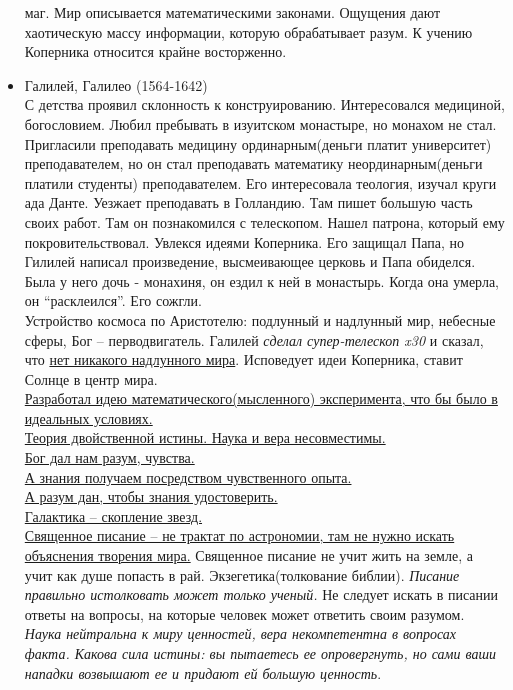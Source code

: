 \documentclass[a4paper,12pt]{report} %
\begin{document}
\begin{itemize}
  маг. Мир описывается математическими законами. Ощущения дают
  хаотическую массу информации, которую обрабатывает разум. К учению
  Коперника относится крайне восторженно.
\item Галилей, Галилео (1564-1642)\\
  С детства проявил склонность к конструированию. Интересовался
  медициной, богословием. Любил пребывать в изуитском монастыре, но
  монахом не стал. Пригласили преподавать медицину ординарным(деньги
  платит университет)
  преподавателем, но он стал преподавать математику
  неординарным(деньги платили студенты)
  преподавателем. Его интересовала теология, изучал круги ада
  Данте. Уезжает преподавать в Голландию. Там пишет большую часть своих
  работ. Там он познакомился с телескопом. Нашел патрона, который ему
  покровительствовал. Увлекся идеями Коперника. Его защищал Папа, но
  Гилилей написал произведение, высмеивающее церковь и Папа
  обиделся. Была у него дочь - монахиня, он ездил к ней в
  монастырь. Когда она умерла, он ``расклеился''. Его сожгли.\\
  Устройство космоса по Аристотелю: подлунный и надлунный мир, небесные
  сферы, Бог -- перводвигатель. Галилей \textit{сделал супер-телескоп x30} и сказал,
  что \underline{нет никакого надлунного мира}. Исповедует идеи Коперника,
  ставит Солнце в центр мира.\\ \underline{Разработал идею
    математического(мысленного) эксперимента, что бы было в идеальных
    условиях.}\\ \underline{Теория двойственной истины. Наука и вера несовместимы.}\\ \underline{Бог
    дал нам разум, чувства.}\\ \underline{А знания получаем посредством чувственного
    опыта.}\\ \underline{А разум дан, чтобы знания удостоверить.}\\ \underline{Галактика -- скопление
    звезд.}\\ \underline{Священное писание -- не трактат по астрономии, там не нужно
    искать объяснения творения мира.} Священное писание не учит жить на
  земле, а учит как душе попасть в рай. Экзегетика(толкование
  библии). \textit{Писание правильно истолковать может только ученый.}
  Не следует искать в писании ответы на вопросы, на которые человек
  может ответить своим разумом. \textit{Наука нейтральна к миру ценностей, вера
    некомпетентна в вопросах факта. Какова сила истины: вы пытаетесь ее
    опровергнуть, но сами ваши нападки возвышают ее и придают ей большую ценность}.
\end{itemize}
\end{document}
